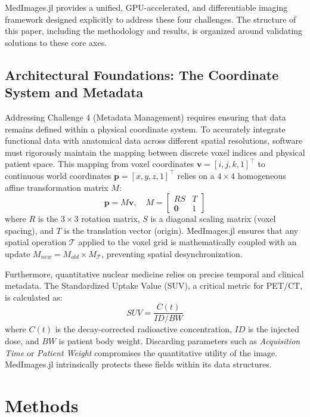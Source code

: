 \documentclass[10pt,letterpaper]{article}
\begin{document}
MedImages.jl provides a unified, GPU-accelerated, and differentiable imaging framework designed explicitly to address these four challenges. The structure of this paper, including the methodology and results, is organized around validating solutions to these core axes.

\subsection{Architectural Foundations: The Coordinate System and Metadata}
Addressing Challenge 4 (Metadata Management) requires ensuring that data remains defined within a physical coordinate system. To accurately integrate functional data with anatomical data across different spatial resolutions, software must rigorously maintain the mapping between discrete voxel indices and physical patient space. This mapping from voxel coordinates $\mathbf{v} = [i, j, k, 1]^\top$ to continuous world coordinates $\mathbf{p} = [x, y, z, 1]^\top$ relies on a $4 \times 4$ homogeneous affine transformation matrix $M$:
\begin{equation}
\mathbf{p} = M \mathbf{v}, \quad M = 
\begin{bmatrix} 
R S & T \\
\mathbf{0} & 1
\end{bmatrix}
\end{equation}
where $R$ is the $3 \times 3$ rotation matrix, $S$ is a diagonal scaling matrix (voxel spacing), and $T$ is the translation vector (origin). MedImages.jl ensures that any spatial operation $\mathcal{T}$ applied to the voxel grid is mathematically coupled with an update $M_{new} = M_{old} \times M_{\mathcal{T}}$, preventing spatial desynchronization.

Furthermore, quantitative nuclear medicine relies on precise temporal and clinical metadata. The Standardized Uptake Value (SUV), a critical metric for PET/CT, is calculated as:
\begin{equation}
SUV = \frac{C(t)}{ID / BW}
\end{equation}
where $C(t)$ is the decay-corrected radioactive concentration, $ID$ is the injected dose, and $BW$ is patient body weight. Discarding parameters such as \textit{Acquisition Time} or \textit{Patient Weight} compromises the quantitative utility of the image. MedImages.jl intrinsically protects these fields within its data structures.

\section{Methods}
\end{document}
